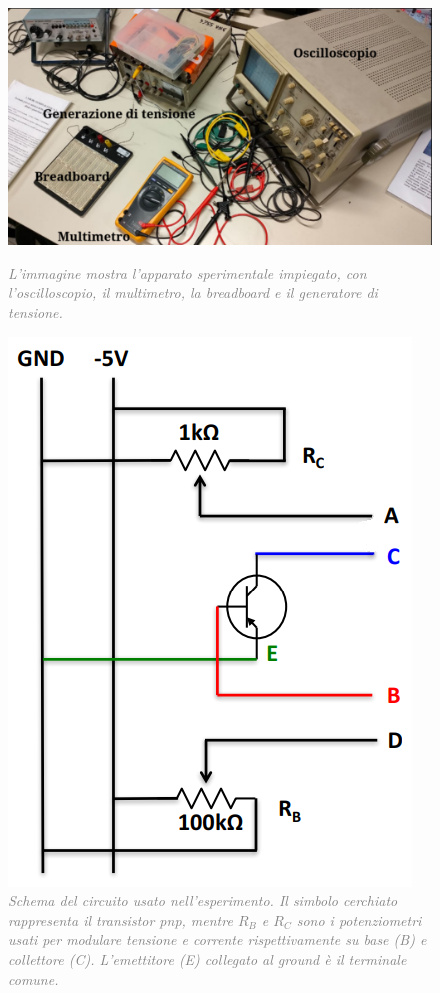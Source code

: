 \documentclass[a4paper,11pt]{article}
\begin{document}
\begin{figure}
    \centering
    \begin{minipage}{0.5\textwidth}
        \includegraphics[width=1\linewidth]{pictures/apparato.png}
          \caption{\textit{\textcolor{gray}{L'immagine mostra l'apparato sperimentale impiegato, con l'oscilloscopio, il multimetro, la breadboard e il generatore di tensione. }}}
        \label{fig::apparato}
    \end{minipage}
    \hfill
    \begin{minipage}{0.49\textwidth}
        \includegraphics[width=0.6\linewidth]{pictures/circuito.png}
        \centering
        \caption{\textit{\textcolor{gray}{Schema del circuito usato nell'esperimento. Il simbolo cerchiato rappresenta il transistor pnp, mentre $R_B$ e $R_C$ sono i potenziometri usati per modulare tensione e corrente rispettivamente su base (B) e collettore (C). L'emettitore (E) collegato al ground è il terminale comune.}}}
        \label{fig::circuito}
    \end{minipage}
\end{figure}
\end{document}
